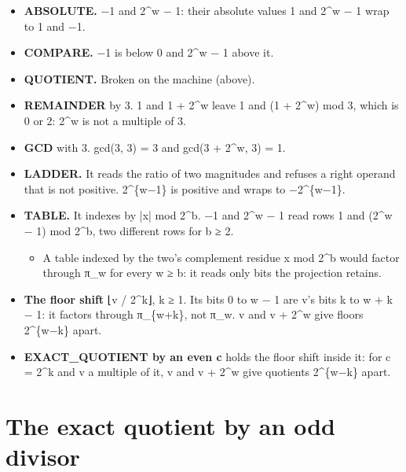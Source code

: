 \begin{itemize}
\item \textbf{ABSOLUTE.} −1 and 2\textasciicircum{}w − 1: their absolute values 1 and 2\textasciicircum{}w − 1 wrap to 1 and −1.
\item \textbf{COMPARE.} −1 is below 0 and 2\textasciicircum{}w − 1 above it.
\item \textbf{QUOTIENT.} Broken on the machine (above).
\item \textbf{REMAINDER} by 3. 1 and 1 + 2\textasciicircum{}w leave 1 and (1 + 2\textasciicircum{}w) mod 3, which is 0 or 2: 2\textasciicircum{}w is not a multiple of 3.
\item \textbf{GCD} with 3. gcd(3, 3) = 3 and gcd(3 + 2\textasciicircum{}w, 3) = 1.
\item \textbf{LADDER.} It reads the ratio of two magnitudes and refuses a right operand that is not positive. 2\textasciicircum{}\{w−1\} is positive and wraps to −2\textasciicircum{}\{w−1\}.
\item \textbf{TABLE.} It indexes by |x| mod 2\textasciicircum{}b. −1 and 2\textasciicircum{}w − 1 read rows 1 and (2\textasciicircum{}w − 1) mod 2\textasciicircum{}b, two different rows for b ≥ 2.

\begin{itemize}
\item A table indexed by the two's complement residue x mod 2\textasciicircum{}b would factor through π\_\allowbreak{}w for every w ≥ b: it reads only bits the projection retains.
\end{itemize}
\item \textbf{The floor shift} ⌊v / 2\textasciicircum{}k⌋, k ≥ 1. Its bits 0 to w − 1 are v's bits k to w + k − 1: it factors through π\_\allowbreak{}\{w+k\}, not π\_\allowbreak{}w. v and v + 2\textasciicircum{}w give floors 2\textasciicircum{}\{w−k\} apart.
\item \textbf{EXACT\_\allowbreak{}QUOTIENT by an even c} holds the floor shift inside it: for c = 2\textasciicircum{}k and v a multiple of it, v and v + 2\textasciicircum{}w give quotients 2\textasciicircum{}\{w−k\} apart.
\end{itemize}

\section{\texorpdfstring{The exact quotient by an odd divisor}{The exact quotient by an odd divisor}}

